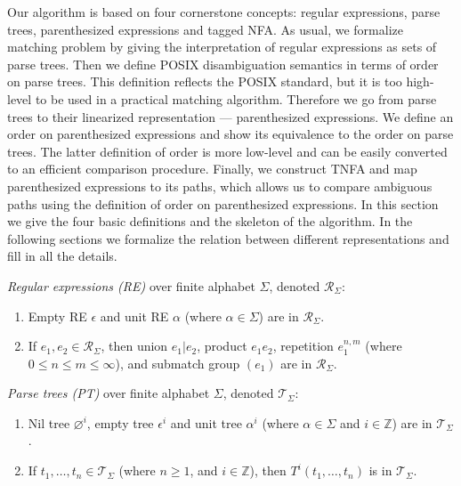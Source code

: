 \documentclass[AMA,STIX1COL]{WileyNJD-v2}
\newcommand{\XR}{\mathcal{R}}
\newcommand{\XT}{\mathcal{T}}
\newcommand{\YZ}{\mathbb{Z}}
\begin{document}
Our algorithm is based on four cornerstone concepts:
regular expressions, parse trees, parenthesized expressions and tagged NFA.
%
As usual, we formalize matching problem
by giving the interpretation of regular expressions as sets of parse trees.
%
Then we define POSIX disambiguation semantics in terms of order on parse trees.
This definition reflects the POSIX standard,
but it is too high-level to be used in a practical matching algorithm.
%
Therefore we go from parse trees to their linearized representation --- parenthesized expressions.
We define an order on parenthesized expressions and show its equivalence to the order on parse trees.
The latter definition of order is more low-level and can be easily converted to an efficient comparison procedure.
%
Finally, we construct TNFA and map parenthesized expressions to its paths,
which allows us to compare ambiguous paths using the definition of order on parenthesized expressions.
%
In this section we give the four basic definitions and the skeleton of the algorithm.
In the following sections we formalize the relation between different representations and fill in all the details.

    \begin{definition}
    \emph{Regular expressions (RE)} over finite alphabet $\Sigma$, denoted $\XR_\Sigma$:
    \begin{enumerate}
        \item
          Empty RE $\epsilon$ and
          unit RE $\alpha$ (where $\alpha \in \Sigma$) are in $\XR_\Sigma$.
        \item If $e_1, e_2 \in \XR_\Sigma$, then
          union $e_1 | e_2$,
          product $e_1 e_2$,
          repetition $e_1^{n, m}$ (where $0 \leq n \leq m \leq \infty$), and
          submatch group $(e_1)$
          are in $\XR_\Sigma$.
    \end{enumerate}
    \end{definition}


    \begin{definition}
    \emph{Parse trees (PT)} over finite alphabet $\Sigma$, denoted $\XT_\Sigma$:
    \begin{enumerate}
        \item
          Nil tree ${\varnothing}^i$,
          empty tree ${\epsilon}^i$ and
          unit tree ${\alpha}^i$ (where $\alpha \in \Sigma$ and $i \in \YZ$)
          are in $\XT_\Sigma$.
        \item If $t_1, \dots, t_n \in \XT_\Sigma$ (where $n \geq 1$, and $i \in \YZ$), then
          ${T}^i(t_1, \dots, t_n)$
          is in $\XT_\Sigma$.
    \end{enumerate}
    \end{definition}
\end{document}
